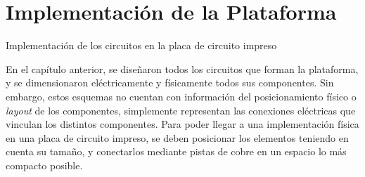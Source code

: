 \section{Implementación de la Plataforma} \label{implementacion}
\thispagestyle{plain}

\vspace{0.5cm}

\Large\scshape
\begin{center}
    \textrm{Implementación de los circuitos en la placa de circuito impreso}
\end{center}
\normalfont

\divider

En el capítulo anterior, se diseñaron todos los circuitos que forman la plataforma, y se dimensionaron eléctricamente y físicamente todos sus componentes. Sin embargo, estos esquemas no cuentan con información del posicionamiento físico o \textit{layout} de los componentes, simplemente representan las conexiones eléctricas que vinculan los distintos componentes. Para poder llegar a una implementación física en una placa de circuito impreso, se deben posicionar los elementos teniendo en cuenta su tamaño, y conectarlos mediante pistas de cobre en un espacio lo más compacto posible.\\

